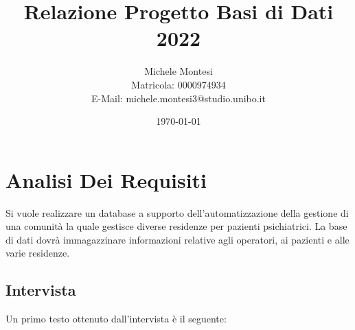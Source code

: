 \documentclass[a4paper, 12pt]{report}
\title{Relazione Progetto Basi di Dati 2022}
\author{Michele Montesi \\
        Matricola: 0000974934 \\
        E-Mail: michele.montesi3@studio.unibo.it}
\date{\today}
\begin{document}
    
\maketitle
\tableofcontents

\chapter{Analisi Dei Requisiti}
Si vuole realizzare un database a supporto dell'automatizzazione della gestione di una
comunità la quale gestisce diverse residenze per pazienti psichiatrici.
La base di dati dovrà immagazzinare informazioni relative agli operatori, ai pazienti e
alle varie residenze.

\section{Intervista}
Un primo testo ottenuto dall'intervista è il seguente:
\end{document}
